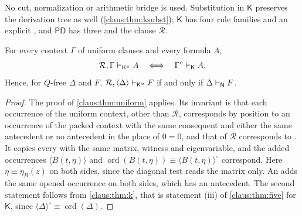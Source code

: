 No cut, normalization or arithmetic bridge is used. Substitution in
$\mathsf{K}$ preserves the derivation tree as well
(\cref{claus:thm:ksubst}); $\mathsf{K}$ has four rule families and an
explicit , and $\mathsf{PD}$ has three and the clause
$\mathcal{R}$.

\begin{theorem}
\label{claus:thm:ku}
For every context $\Gamma$ of uniform clauses and every formula $A$,
\[
 \mathcal{R},\Gamma\vdash_{\mathsf{K}^{u}}A\quad\Longleftrightarrow\quad
 \Gamma^{\circ}\vdash_{\mathsf{K}}A .
\]
Hence, for $Q$-free $\Delta$ and $F$,
$\mathcal{R},\langle\Delta\rangle\vdash_{\mathsf{K}^{u}}F$ if and only if
$\Delta\vdash_{\mathsf{N}}F$.
\end{theorem}
\begin{proof}
The proof of \cref{claus:thm:uniform} applies. Its invariant is that each
occurrence of the uniform context, other than $\mathcal{R}$, corresponds by
position to an occurrence of the packed context with the same consequent
and either the same antecedent or no antecedent in the place of $0=0$,
and that  of $\mathcal{R}$ corresponds to .
It copies every  with the same matrix,
witness and eigenvariable, and the added occurrences
$\langle B(t,\eta)\rangle$ and $\operatorname{ord}(B(t,\eta))\equiv
\langle B(t,\eta)\rangle^{\circ}$ correspond. Here $\eta\equiv\eta_B(z)$
on both sides, since the diagonal test reads the matrix only. An
 adds the same opened occurrence on both sides, which has an
antecedent. The second statement follows from \cref{claus:thm:k}, that is
statement (iii) of \cref{claus:thm:five} for $\mathsf{K}$, since
$\langle\Delta\rangle^{\circ}\equiv\operatorname{ord}(\Delta)$.
\end{proof}

